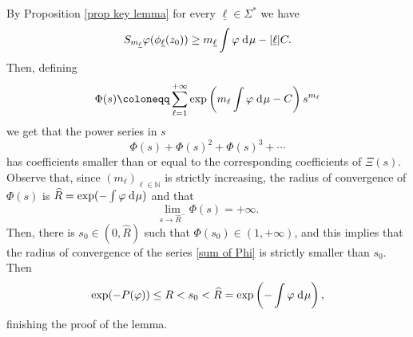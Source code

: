 \documentclass[12pt]{amsart}
\numberwithin{equation}{section} %
\numberwithin{figure}{section} %
\theoremstyle{plain}
\theoremstyle{definition}
\theoremstyle{remark}
\theoremstyle{citing}
\newcommand{\N}{\mathbb{N}}
\renewcommand{\=}{\coloneqq}
\newcommand{\dd}{\hspace{1pt}\operatorname{d}\hspace{-1pt}}
\begin{document}
    By Proposition \ref{prop key lemma} for every $\underline{\ell}\in\Sigma^*$ we have
    \begin{equation*}
        S_{m_{\underline{\ell}}}
        \varphi(\phi_{\underline{\ell}}(z_0)) \geq m_{\underline{\ell}} \int \varphi \dd\mu - |\underline{\ell}|C.
    \end{equation*}
    Then, defining 
    \begin{equation}
        \Phi(s) \= \sum_{\ell=1}^{+\infty} \exp\left( m_\ell \int \varphi \dd \mu - C\right)s^{m_\ell}
    \end{equation}
    we get that the power series in $s$
    \begin{equation}\label{sum of Phi}
        \Phi(s) + \Phi(s)^2 + \Phi(s)^3+\cdots
    \end{equation}
    has coefficients smaller than or equal to the corresponding coefficients of $\Xi(s)$. Observe that, since $(m_{\ell})_{\ell\in \N}$ is strictly increasing, the radius of convergence of $\Phi(s)$ is $\widehat{R}= \exp(-\int \varphi \dd\mu)$ and that 
    \begin{equation}
        \lim_{s\to\widehat{R}^-} \Phi (s) = +\infty.
    \end{equation}
    Then, there is $s_0\in (0,\widehat{R})$ such that $\Phi(s_0)\in (1,+\infty)$, and this implies that the radius of convergence of the series \eqref{sum of Phi} is strictly smaller than $s_0$. Then
    \begin{equation*}
        \exp(-P(\varphi)) \leq R < s_0 <\widehat{R} = \exp\left(-\int \varphi \dd \mu \right),
    \end{equation*}
    finishing the proof of the lemma.
\end{document}
